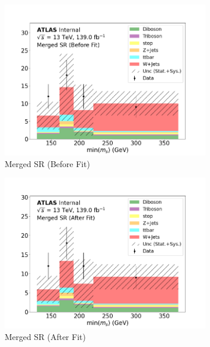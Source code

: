 \begin{figure}[h]
  \centering
  \begin{subfigure}{0.45\textwidth}
    \includegraphics[width=\textwidth]{Figures/8/SR_Merged_before.pdf}
    \caption{Merged SR (Before Fit)}\label{fig:before_SR_merged}
  \end{subfigure} \hspace{1em}
  \begin{subfigure}{0.45\textwidth}
    \includegraphics[width=\textwidth]{Figures/8/SR_Merged_after.pdf}
    \caption{Merged SR (After Fit)}\label{fig:after_SR_merged}
  \end{subfigure} \vspace{1em}
  \begin{subfigure}{0.45\textwidth}

\end{subfigure}
\end{figure}

